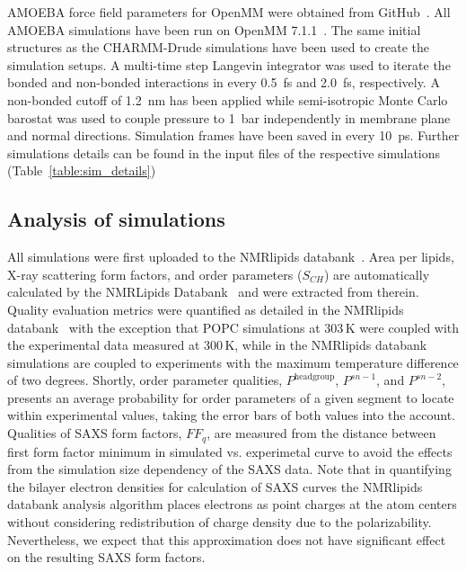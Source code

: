 \documentclass[journal=jacsat,manuscript=article,layout=singlecolumn]{achemso}
\begin{document}
AMOEBA force field parameters for OpenMM were obtained from GitHub~\cite{amoebagithub,klesse2020induced}. All AMOEBA simulations have been run on OpenMM 7.1.1~\cite{eastman2017openmm}. The same initial structures as the CHARMM-Drude simulations have been used to create the simulation setups. A multi-time step Langevin integrator was used to iterate the bonded and non-bonded interactions in every 0.5~fs and 2.0~fs, respectively. A non-bonded cutoff of 1.2~nm has been applied while semi-isotropic Monte Carlo barostat was used to couple pressure to 1~bar independently in membrane plane and normal directions.
Simulation frames have been saved in every 10~ps. Further simulations details can be found in the input files of the respective simulations (Table~\ref{table:sim_details})


\subsection{Analysis of simulations}
 All simulations were first uploaded to the NMRlipids databank~\cite{Databank}. 
Area per lipids, X-ray scattering form factors, and order parameters ($S_{CH}$) are automatically calculated by the NMRLipids Databank~\cite{Databank} and were extracted from therein. Quality evaluation metrics were quantified as detailed in the NMRlipids databank~\cite{Databank} with the exception that POPC simulations at 303\,K were coupled with the experimental data measured at 300\,K, while in the NMRlipids databank simulations are coupled to experiments with the maximum temperature difference of two degrees. Shortly, order parameter qualities, $P^{\mathrm{headgroup}}$, $P^{sn-1}$, and $P^{sn-2}$, presents an average probability for order parameters of a given segment to locate within experimental values, taking the error bars of both values into the account. Qualities of SAXS form factors, $FF_{q}$, are measured from the distance between first form factor minimum in simulated vs. experimetal curve to avoid the effects from the simulation size dependency of the SAXS data.
Note that in quantifying the bilayer electron densities for calculation of SAXS curves  the NMRlipids databank analysis algorithm places electrons as point charges at the atom centers without considering redistribution of charge density due to the polarizability. Nevertheless, we expect that this approximation does not have significant effect on the resulting SAXS form factors.
\end{document}
